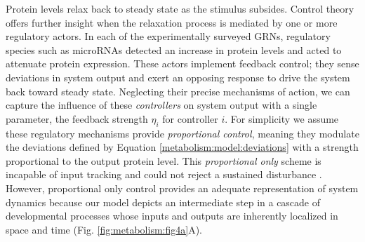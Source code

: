 Protein levels relax back to steady state as the stimulus subsides. Control theory offers further insight when the relaxation process is mediated by one or more regulatory actors. In each of the experimentally surveyed GRNs, regulatory species such as microRNAs detected an increase in protein levels and acted to attenuate protein expression. These actors implement feedback control; they sense deviations in system output and exert an opposing response to drive the system back toward steady state. Neglecting their precise mechanisms of action, we can capture the influence of these \emph{controllers} on system output with a single parameter, the feedback strength $\eta_i$ for controller $i$. For simplicity we assume these regulatory mechanisms provide \emph{proportional control}, meaning they modulate the deviations defined by Equation \ref{metabolism:model:deviations} with a strength proportional to the output protein level. This \emph{proportional only} scheme is incapable of input tracking and could not reject a sustained disturbance \cite{Yi2000}. However, proportional only control provides an adequate representation of system dynamics because our model depicts an intermediate step in a cascade of developmental processes whose inputs and outputs are inherently localized in space and time (Fig. \ref{fig:metabolism:fig4a}A).

